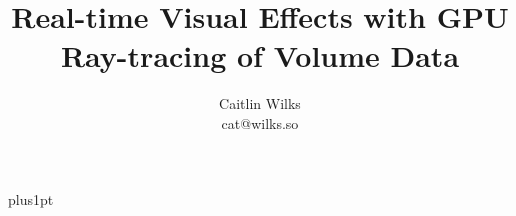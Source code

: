 \documentclass[12pt]{ociamthesis}
\title{Real-time Visual Effects with GPU Ray-tracing of Volume Data}
\author{Caitlin Wilks\\cat@wilks.so}
\begin{document}
\baselineskip=18pt plus1pt

\setcounter{secnumdepth}{4}
\setcounter{tocdepth}{2}

\maketitle                  %

\begin{romanpages}          %
\tableofcontents            %
\newpage
\listoffigures              %
\end{romanpages}            %









\nocite{*}
\printbibliography

\renewcommand\thesection{Appendix \Alph{section}}
\renewcommand\thesubsection{\arabic{subsection}}

\appendix

\end{document}
